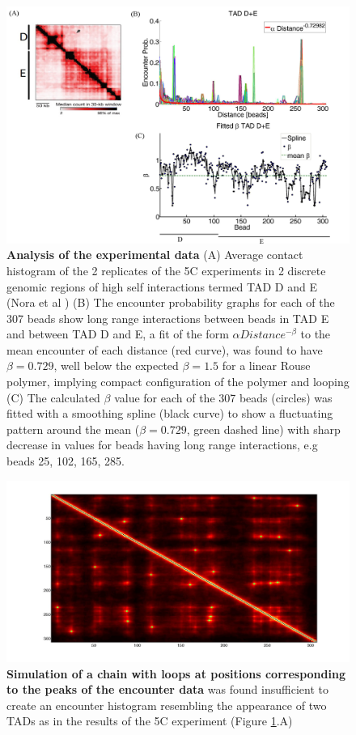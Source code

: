 \documentclass[12pt]{article}
\begin{document}
\begin{figure}[H]
\includegraphics[scale=0.7]{Figure01_AnalysisOfTheExperimentalData}
\caption{\textbf{Analysis of the experimental data} (A) Average contact histogram of the 2 replicates of the 5C experiments in 2 discrete genomic regions of high self interactions termed TAD D and E (Nora et al \cite{Nora2012}) (B) The encounter probability graphs for each of the 307 beads show long range interactions between beads in TAD E and between TAD D and E, a fit of the form $\alpha Distance ^{-\beta}$ to the mean encounter of each distance (red curve), was found to have $\beta=0.729$, well below the expected $\beta=1.5$ for a linear Rouse polymer, implying compact configuration of the polymer and looping (C) The calculated $\beta$ value for each of the 307 beads (circles) was fitted with a smoothing spline (black curve) to show a fluctuating pattern around the mean ($\beta=0.729$, green dashed line) with sharp decrease in values for beads having long range interactions, e.g beads 25, 102, 165, 285.}
\label{figure_TADDAndENoraEtAl2012}
\end{figure}

\begin{figure}[H]
\includegraphics[scale=0.2]{meanEncounterMatrixOfSimulatingTADEandDWithLoops}
\caption{\textbf{Simulation of a chain with loops at positions corresponding to the peaks of the encounter data} was found insufficient to create an encounter histogram resembling the appearance of two TADs as in the results of the 5C experiment (Figure \ref{figure_TADDAndENoraEtAl2012}.A)}
\label{figure_encounterProbabilityPeaksOfTheEncounterData}
\end{figure}
\end{document}
